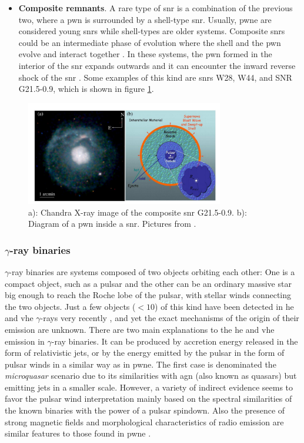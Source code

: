 \documentclass[main.tex]{subfiles}
\begin{document}
\begin{itemize}
    \item \textbf{Composite remnants}. A rare type of \gls{snr} is a combination of the previous two, where a \gls{pwn} is surrounded by a shell-type \gls{snr}. Usually, \gls{pwne} are considered young \glspl{snr} while shell-types are older systems. Composite \glspl{snr} could be an intermediate phase of evolution where the shell and the \gls{pwn} evolve and interact together \cite{2014compositeSNRhess}. In these systems, the \gls{pwn} formed in the interior of the \gls{snr} expands outwards and it can encounter the inward reverse shock of the \gls{snr} \cite{2015SNRingammarays}. Some examples of this kind are \glspl{snr} W28, W44, and SNR G21.5-0.9, which is shown in figure \ref{fig:compositesnr}.
\end{itemize} 

\begin{figure}
\centering
 \includegraphics[width=0.77\textwidth]{Pictures/compositesnr.pdf}
  \caption{a): Chandra X-ray image of the composite \gls{snr} G21.5-0.9. b): Diagram of a \gls{pwn} inside a \gls{snr}. Pictures from \cite{2015SNRingammarays}.}
    \label{fig:compositesnr}
\end{figure}

\subsubsection{$\gamma$-ray binaries}

$\gamma$-ray binaries are systems composed of two objects orbiting each other: One is a compact object, such as a pulsar and the other can be an ordinary massive star big enough to reach the Roche lobe of the pulsar, with stellar winds connecting the two objects. Just a few objects ($< 10$) of this kind have been detected in \gls{he} and \gls{vhe} $\gamma$-rays very recently \cite{2017gammarybinariespop}, and yet the exact mechanisms of the origin of their emission are unknown.
There are two main explanations to the \gls{he} and \gls{vhe} emission in $\gamma$-ray binaries. It can be produced by accretion energy released in the form of relativistic jets, or by the energy emitted by the pulsar in the form of pulsar winds in a similar way as in \gls{pwne}. The first case is denominated the \textit{microquasar} scenario due to its similarities with \gls{agn} (also known as quasars) but emitting jets in a smaller scale. However, a variety of indirect evidence seems to favor the pulsar wind interpretation mainly based on the spectral similarities of the known binaries with the power of a pulsar spindown. Also the presence of strong magnetic fields and morphological characteristics of radio emission are similar features to those found in \gls{pwne} \cite{2013binaries}. 
\end{document}
